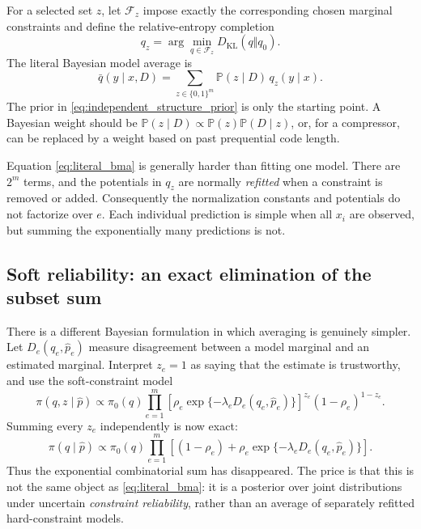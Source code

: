 \documentclass[11pt]{article}
\newcommand{\Pp}{\mathbb P}
\newcommand{\KL}{D_{\mathrm{KL}}}
\newcommand{\1}{\mathbf 1}
\newcommand{\hatp}{\widehat p}
\begin{document}
For a selected set \(z\), let \(\mathcal F_z\) impose exactly the corresponding
chosen marginal constraints and define the relative-entropy completion
\[
  q_z
  =
  \arg\min_{q\in\mathcal F_z}\KL(q\Vert q_0).
\]
The literal Bayesian model average is
\begin{equation}
  \bar q(y\mid x,D)
  =
  \sum_{z\in\{0,1\}^m}
  \Pp(z\mid D)\,q_z(y\mid x).
  \label{eq:literal_bma}
\end{equation}
The prior in \eqref{eq:independent_structure_prior} is only the starting
point.  A Bayesian weight should be
\(\Pp(z\mid D)\propto \Pp(z)\Pp(D\mid z)\), or, for a compressor, can be
replaced by a weight based on past prequential code length.

Equation \eqref{eq:literal_bma} is generally harder than fitting one model.
There are \(2^m\) terms, and the potentials in \(q_z\) are normally
\emph{refitted} when a constraint is removed or added.  Consequently the
normalization constants and potentials do not factorize over \(e\).  Each
individual prediction is simple when all \(x_i\) are observed, but summing the
exponentially many predictions is not.

\subsection{Soft reliability: an exact elimination of the subset sum}

There is a different Bayesian formulation in which averaging is genuinely
simpler.  Let \(D_e(q_e,\hatp_e)\) measure disagreement between a model
marginal and an estimated marginal.  Interpret \(z_e=1\) as saying that the
estimate is trustworthy, and use the soft-constraint model
\begin{equation}
  \pi(q,z\mid\hatp)
  \propto
  \pi_0(q)
  \prod_{e=1}^m
  \left[
    \rho_e\exp\{-\lambda_eD_e(q_e,\hatp_e)\}
  \right]^{z_e}
  (1-\rho_e)^{1-z_e}.
  \label{eq:soft_reliability_joint}
\end{equation}
Summing every \(z_e\) independently is now exact:
\begin{equation}
  \pi(q\mid\hatp)
  \propto
  \pi_0(q)
  \prod_{e=1}^m
  \left[
    (1-\rho_e)
    +
    \rho_e\exp\{-\lambda_eD_e(q_e,\hatp_e)\}
  \right].
  \label{eq:soft_reliability_marginal}
\end{equation}
Thus the exponential combinatorial sum has disappeared.  The price is that
this is not the same object as \eqref{eq:literal_bma}: it is a posterior over
joint distributions under uncertain \emph{constraint reliability}, rather than
an average of separately refitted hard-constraint models.
\end{document}
